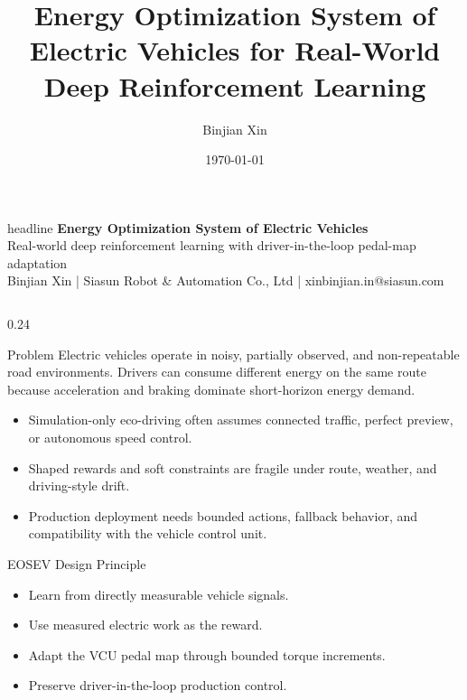 \documentclass[final,professionalfonts]{beamer}
\author{Binjian Xin}
\date{\today}
\title{Energy Optimization System of Electric Vehicles for Real-World Deep Reinforcement Learning}
\begin{document}
\begin{frame}[t]
\begin{beamercolorbox}[wd=\paperwidth,sep=1.4em,center]{headline}
  {\fontsize{54}{60}\selectfont\bfseries Energy Optimization System of Electric Vehicles}\\[0.25em]
  {\fontsize{34}{38}\selectfont Real-world deep reinforcement learning with driver-in-the-loop pedal-map adaptation}\\[0.45em]
  {\Large Binjian Xin \quad | \quad Siasun Robot \& Automation Co., Ltd \quad | \quad xinbinjian.in@siasun.com}
\end{beamercolorbox}

\vspace{0.2em}
\begin{columns}[t,totalwidth=0.97\paperwidth]

\begin{column}{0.24\paperwidth}
\begin{block}{Problem}
\justifying
Electric vehicles operate in noisy, partially observed, and non-repeatable road environments. Drivers can consume different energy on the same route because acceleration and braking dominate short-horizon energy demand.

\vspace{0.6em}
\begin{itemize}
\item Simulation-only eco-driving often assumes connected traffic, perfect preview, or autonomous speed control.
\item Shaped rewards and soft constraints are fragile under route, weather, and driving-style drift.
\item Production deployment needs bounded actions, fallback behavior, and compatibility with the vehicle control unit.
\end{itemize}
\end{block}

\begin{block}{EOSEV Design Principle}
\begin{itemize}
\item Learn from directly measurable vehicle signals.
\item Use measured electric work as the reward.
\item Adapt the VCU pedal map through bounded torque increments.
\item Preserve driver-in-the-loop production control.
\end{itemize}
\end{block}


\end{column}
\end{columns}
\end{frame}
\end{document}
